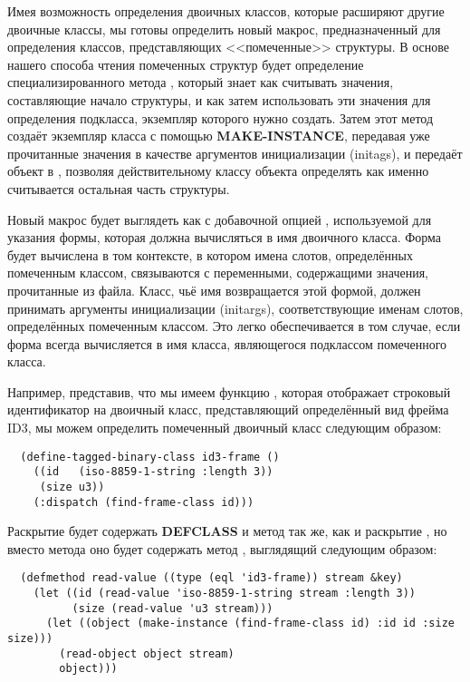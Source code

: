 Имея возможность определения двоичных классов, которые расширяют другие двоичные классы,
мы готовы определить новый макрос, предназначенный для определения классов, представляющих
<<помеченные>> структуры. В основе нашего способа чтения помеченных структур будет
определение специализированного метода , который знает как считывать
значения, составляющие начало структуры, и как затем использовать эти значения для
определения подкласса, экземпляр которого нужно создать. Затем этот метод создаёт
экземпляр класса с помощью \textbf{MAKE-INSTANCE}, передавая уже прочитанные значения в
качестве аргументов инициализации (initags), и передаёт объект в ,
позволяя действительному классу объекта определять как именно считывается остальная часть
структуры.

Новый макрос  будет выглядеть как
 с добавочной опцией , используемой для указания
формы, которая должна вычисляться в имя двоичного класса. Форма  будет
вычислена в том контексте, в котором имена слотов, определённых помеченным классом,
связываются с переменными, содержащими значения, прочитанные из файла. Класс, чьё имя
возвращается этой формой, должен принимать аргументы инициализации (initargs),
соответствующие именам слотов, определённых помеченным классом. Это легко обеспечивается в
том случае, если форма  всегда вычисляется в имя класса, являющегося
подклассом помеченного класса.

Например, представив, что мы имеем функцию , которая отображает
строковый идентификатор на двоичный класс, представляющий определённый вид фрейма ID3, мы
можем определить помеченный двоичный класс  следующим образом:

\begin{lstlisting}
  (define-tagged-binary-class id3-frame ()
    ((id   (iso-8859-1-string :length 3))
     (size u3))
    (:dispatch (find-frame-class id)))
\end{lstlisting}

Раскрытие  будет содержать \textbf{DEFCLASS} и метод  так же, как и раскрытие , но вместо метода  оно будет содержать метод , выглядящий следующим образом:

\begin{lstlisting}
  (defmethod read-value ((type (eql 'id3-frame)) stream &key)
    (let ((id (read-value 'iso-8859-1-string stream :length 3))
          (size (read-value 'u3 stream)))
      (let ((object (make-instance (find-frame-class id) :id id :size size)))
        (read-object object stream)
        object)))
\end{lstlisting}

